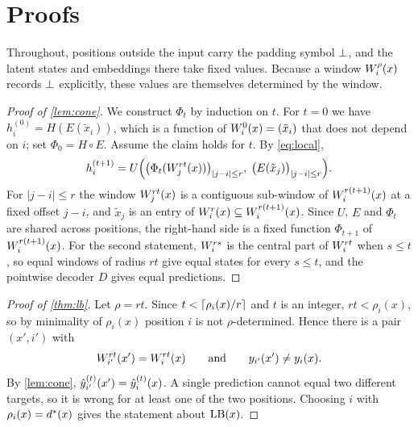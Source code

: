 \section{Proofs}
\label{app:proofs}

Throughout, positions outside the input carry the padding symbol $\bot$, and the latent states and
embeddings there take fixed values. Because a window $W_{i}^{\rho}(x)$ records $\bot$ explicitly, these
values are themselves determined by the window.

\begin{proof}[Proof of \cref{lem:cone}]
We construct $\Phi_t$ by induction on $t$. For $t=0$ we have $h_i^{(0)} = H(E(\tilde x_i))$, which is
a function of $W_{i}^{0}(x)=(\tilde x_i)$ that does not depend on $i$; set $\Phi_0 = H\circ E$. Assume
the claim holds for $t$. By \cref{eq:local},
\begin{equation*}
  h_i^{(t+1)} = U\Bigl(\bigl(\Phi_t(W_{j}^{rt}(x))\bigr)_{|j-i|\le r},\;
  \bigl(E(\tilde x_j)\bigr)_{|j-i|\le r}\Bigr).
\end{equation*}
For $|j-i|\le r$ the window $W_{j}^{rt}(x)$ is a contiguous sub-window of $W_{i}^{r(t+1)}(x)$ at a
fixed offset $j-i$, and $\tilde x_j$ is an entry of $W_{i}^{r}(x)\subseteq W_{i}^{r(t+1)}(x)$. Since
$U$, $E$ and $\Phi_t$ are shared across positions, the right-hand side is a fixed function
$\Phi_{t+1}$ of $W_{i}^{r(t+1)}(x)$. For the second statement, $W_{i}^{rs}$ is the central part of
$W_{i}^{rt}$ when $s\le t$, so equal windows of radius $rt$ give equal states for every $s\le t$, and
the pointwise decoder $D$ gives equal predictions.
\end{proof}

\begin{proof}[Proof of \cref{thm:lb}]
Let $\rho = rt$. Since $t<\lceil\rho_i(x)/r\rceil$ and $t$ is an integer, $rt<\rho_i(x)$, so by minimality
of $\rho_i(x)$ position $i$ is not $\rho$-determined. Hence there is a pair $(x',i')$ with
\begin{equation*}
  W_{i'}^{rt}(x') = W_{i}^{rt}(x)
  \qquad\text{and}\qquad
  y_{i'}(x')\ne y_i(x).
\end{equation*}
By \cref{lem:cone}, $\hat{y}_{i'}^{(t)}(x') = \hat{y}_i^{(t)}(x)$. A single prediction cannot equal two
different targets, so it is wrong for at least one of the two positions. Choosing $i$ with
$\rho_i(x)=d^{*}(x)$ gives the statement about $\operatorname{LB}(x)$.
\end{proof}

